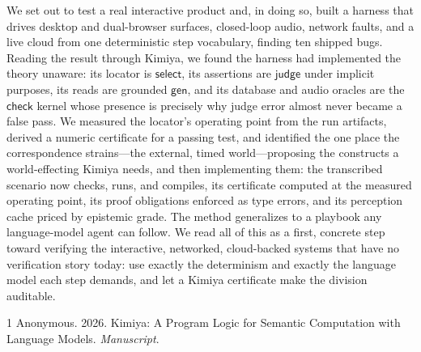 \documentclass[acmsmall,screen,nonacm]{acmart}
\newcommand{\gen}{\mathsf{gen}}
\newcommand{\checkk}{\mathsf{check}}
\newcommand{\judge}{\mathsf{judge}}
\newcommand{\select}{\mathsf{select}}
\theoremstyle{acmdefinition}%
\theoremstyle{acmplain}%
\begin{document}
We set out to test a real interactive product and, in doing so, built a
harness that drives desktop and dual-browser surfaces, closed-loop audio,
network faults, and a live cloud from one deterministic step vocabulary,
finding ten shipped bugs. Reading the result through Kimiya, we found the
harness had implemented the theory unaware: its locator is $\select$, its
assertions are $\judge$ under implicit purposes, its reads are grounded
$\gen$, and its database and audio oracles are the $\checkk$ kernel whose
presence is precisely why judge error almost never became a false pass. We
measured the locator's operating point from the run artifacts, derived a
numeric certificate for a passing test, and identified the one place the
correspondence strains---the external, timed world---proposing the
constructs a world-effecting Kimiya needs, and then implementing them:
the transcribed scenario now checks, runs, and compiles, its
certificate computed at the measured operating point, its proof
obligations enforced as type errors, and its perception cache priced by
epistemic grade. The method generalizes to a
playbook any language-model agent can follow. We read all of this as a
first, concrete step toward verifying the interactive, networked,
cloud-backed systems that have no verification story today: use exactly
the determinism and exactly the language model each step demands, and let
a Kimiya certificate make the division auditable.


\begin{thebibliography}{1}
Anonymous. 2026.
\newblock Kimiya: A Program Logic for Semantic Computation with Language Models.
\newblock \emph{Manuscript}.
\end{thebibliography}
\end{document}
